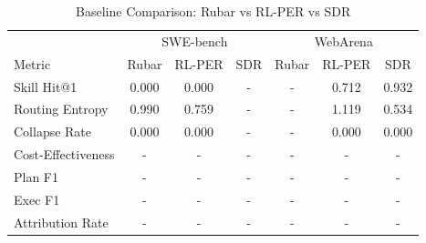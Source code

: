 \begin{table}[h]
\centering
\caption{Baseline Comparison: Rubar vs RL-PER vs SDR}
\label{tab:baseline}
\begin{tabular}{l|ccc|ccc}
\toprule
 & \multicolumn{3}{c|}{SWE-bench} & \multicolumn{3}{c}{WebArena} \\
Metric & Rubar & RL-PER & SDR & Rubar & RL-PER & SDR \\
\midrule
Skill Hit@1 & 0.000 & 0.000 & - & - & 0.712 & 0.932 \\
Routing Entropy & 0.990 & 0.759 & - & - & 1.119 & 0.534 \\
Collapse Rate & 0.000 & 0.000 & - & - & 0.000 & 0.000 \\
Cost-Effectiveness & - & - & - & - & - & - \\
Plan F1 & - & - & - & - & - & - \\
Exec F1 & - & - & - & - & - & - \\
Attribution Rate & - & - & - & - & - & - \\
\bottomrule
\end{tabular}
\end{table}